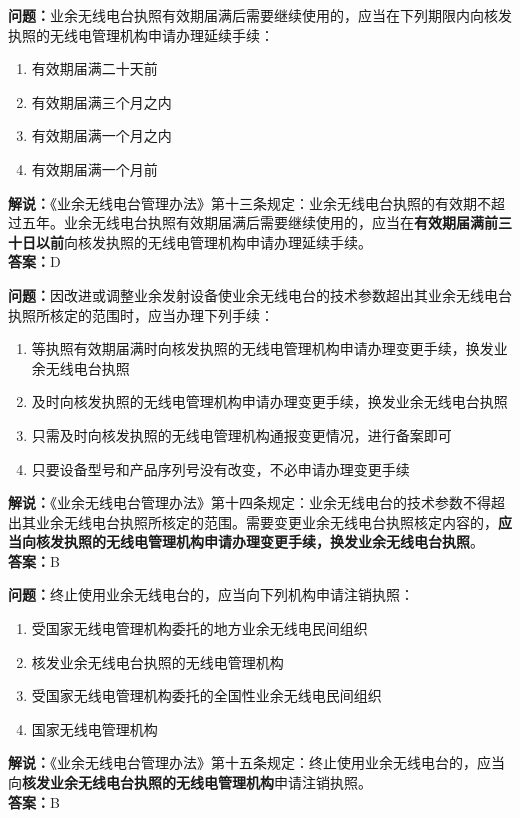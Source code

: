 \bigskip


\noindent\textbf{问题：}业余无线电台执照有效期届满后需要继续使用的，应当在下列期限内向核发执照的无线电管理机构申请办理延续手续：
\begin{enumerate}[label=\Alph*), leftmargin=3em]
	\item 有效期届满二十天前
	\item 有效期届满三个月之内
	\item 有效期届满一个月之内
	\item 有效期届满一个月前
\end{enumerate}
\noindent\textbf{解说：}《业余无线电台管理办法》第十三条规定：业余无线电台执照的有效期不超过五年。业余无线电台执照有效期届满后需要继续使用的，应当在\textbf{有效期届满前三十日以前}向核发执照的无线电管理机构申请办理延续手续。\\\noindent\textbf{答案：}D




\bigskip


\noindent\textbf{问题：}因改进或调整业余发射设备使业余无线电台的技术参数超出其业余无线电台执照所核定的范围时，应当办理下列手续：
\begin{enumerate}[label=\Alph*), leftmargin=3em]
	\item 等执照有效期届满时向核发执照的无线电管理机构申请办理变更手续，换发业余无线电台执照
	\item 及时向核发执照的无线电管理机构申请办理变更手续，换发业余无线电台执照
	\item 只需及时向核发执照的无线电管理机构通报变更情况，进行备案即可
	\item 只要设备型号和产品序列号没有改变，不必申请办理变更手续
\end{enumerate}
\noindent\textbf{解说：}《业余无线电台管理办法》第十四条规定：业余无线电台的技术参数不得超出其业余无线电台执照所核定的范围。需要变更业余无线电台执照核定内容的，\textbf{应当向核发执照的无线电管理机构申请办理变更手续，换发业余无线电台执照}。\\\noindent\textbf{答案：}B



\bigskip


\noindent\textbf{问题：}终止使用业余无线电台的，应当向下列机构申请注销执照：
\begin{enumerate}[label=\Alph*), leftmargin=3em]
	\item 受国家无线电管理机构委托的地方业余无线电民间组织
	\item 核发业余无线电台执照的无线电管理机构
	\item 受国家无线电管理机构委托的全国性业余无线电民间组织
	\item 国家无线电管理机构
\end{enumerate}
\noindent\textbf{解说：}《业余无线电台管理办法》第十五条规定：终止使用业余无线电台的，应当向\textbf{核发业余无线电台执照的无线电管理机构}申请注销执照。\\\noindent\textbf{答案：}B



